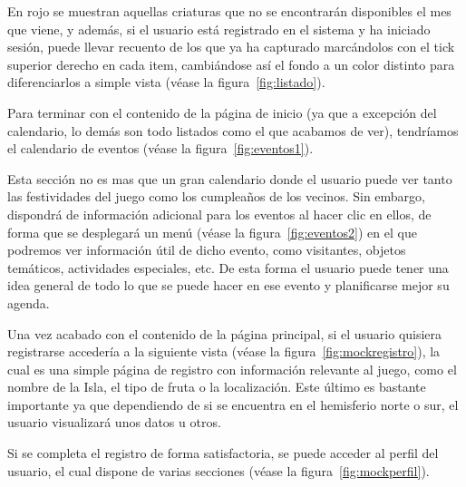 En rojo se muestran aquellas criaturas que no se encontrarán disponibles el mes que viene, y además, si el usuario está registrado en el sistema y ha iniciado sesión, puede llevar recuento de los que ya ha capturado marcándolos con el tick superior derecho en cada item, cambiándose así el fondo a un color distinto para diferenciarlos a simple vista {(v\'ease la figura~\ref{fig:listado})}.\\


\clearpage

Para terminar con el contenido de la página de inicio (ya que a excepción del calendario, lo demás son todo listados como el que acabamos de ver), tendríamos el calendario de eventos {(v\'ease la figura~\ref{fig:eventos1})}.\\


Esta sección no es mas que un gran calendario donde el usuario puede ver tanto las festividades del juego como los cumpleaños de los vecinos. Sin embargo, dispondrá de información adicional para los eventos al hacer clic en ellos, de forma que se desplegará un menú {(v\'ease la figura~\ref{fig:eventos2})} en el que podremos ver información útil de dicho evento, como visitantes, objetos temáticos, actividades especiales, etc. De esta forma el usuario puede tener una idea general de todo lo que se puede hacer en ese evento y planificarse mejor su agenda.\\


\clearpage

Una vez acabado con el contenido de la página principal, si el usuario quisiera registrarse accedería a la siguiente vista {(v\'ease la figura~\ref{fig:mockregistro})}, la cual es una simple página de registro con información relevante al juego, como el nombre de la Isla, el tipo de fruta o la localización. Este último es bastante importante ya que dependiendo de si se encuentra en el hemisferio norte o sur, el usuario visualizará unos datos u otros.\\


Si se completa el registro de forma satisfactoria, se puede acceder al perfil del usuario, el cual dispone de varias secciones {(v\'ease la figura~\ref{fig:mockperfil})}.\\

